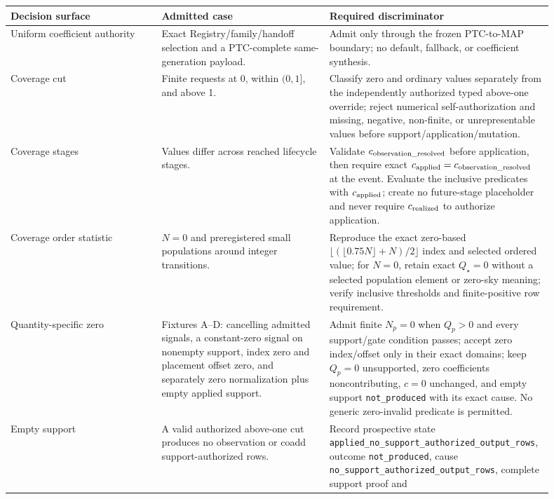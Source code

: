 \documentclass[10pt]{article}
\newcommand{\code}[1]{\nolinkurl{#1}}
\begin{document}
\SCIMapProductRoleDependencyTable

\begin{longtable}{L{0.27\linewidth}L{0.30\linewidth}L{0.33\linewidth}}
\toprule
Decision surface & Admitted case & Required discriminator\\
\midrule
Uniform coefficient authority & Exact Registry/family/handoff selection and a
PTC-complete same-generation payload. & Admit only through the frozen
PTC-to-MAP boundary; no default, fallback, or coefficient synthesis.\\
Coverage cut & Finite requests at 0, within \((0,1]\), and above 1. & Classify
zero and ordinary values separately from the independently authorized typed
above-one override; reject numerical self-authorization and missing, negative,
non-finite, or unrepresentable values before support/application/mutation.\\
Coverage stages & Values differ across reached lifecycle stages. & Validate
\(c_{\rm observation\_resolved}\) before application, then require exact
\(c_{\rm applied}=c_{\rm observation\_resolved}\) at the event. Evaluate the
inclusive predicates with \(c_{\rm applied}\); create no future-stage
placeholder and never require \(c_{\rm realized}\) to authorize application.\\
Coverage order statistic & \(N=0\) and preregistered small populations around
integer transitions. & Reproduce the exact zero-based
\(\lfloor(\lfloor0.75N\rfloor+N)/2\rfloor\) index and selected ordered value;
for \(N=0\), retain exact \(Q_\star=0\) without a selected population element
or zero-sky meaning; verify inclusive thresholds and finite-positive row
requirement.\\
Quantity-specific zero & Fixtures A--D: cancelling admitted signals, a
constant-zero signal on nonempty support, index zero and placement offset zero,
and separately zero normalization plus empty applied support. & Admit finite
\(N_p=0\) when \(Q_p>0\) and every support/gate condition passes; accept zero
index/offset only in their exact domains; keep \(Q_p=0\) unsupported, zero
coefficients noncontributing, \(c=0\) unchanged, and empty support
\code{not_produced} with its exact cause. No generic zero-invalid predicate is
permitted.\\
Empty support & A valid authorized above-one cut produces no observation or
coadd support-authorized rows. & Record prospective state
\code{applied_no_support_authorized_output_rows}, outcome \code{not_produced},
cause \code{no_support_authorized_output_rows}, complete support proof and

\end{longtable}
\end{document}
